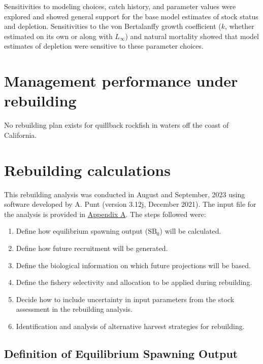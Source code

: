 \documentclass[11pt,
  letterpaper,
]{article}
\begin{document}
Sensitivities to modeling choices, catch history, and parameter values were explored and showed general support for the base model estimates of stock status and depletion. Sensitivities to the von Bertalanffy growth coefficient (\(k\), whether estimated on its own or along with \(L_\infty\)) and natural mortality showed that model estimates of depletion were sensitive to these parameter choices.

\hypertarget{management-performance-under-rebuilding}{%
\section{Management performance under rebuilding}\label{management-performance-under-rebuilding}}

No rebuilding plan exists for quillback rockfish in waters off the coast of California.

\hypertarget{rebuilding-calculations}{%
\section{Rebuilding calculations}\label{rebuilding-calculations}}

This rebuilding analysis was conducted in August and September, 2023 using software developed by A. Punt (version 3.12j, December 2021). The input file for the analysis is provided in \protect\hyperlink{append_a}{Appendix A}. The steps followed were:

\begin{enumerate}
    \item Define how equilibrium spawning output ($\text{SB}_0$) will be calculated. 
    \item Define how future recruitment will be generated.
    \item Define the biological information on which future projections will be based.
    \item Define the fishery selectivity and allocation to be applied during rebuilding. 
    \item Decide how to include uncertainty in input parameters from the stock assessment in the rebuilding analysis. 
    \item Identification and analysis of alternative harvest strategies for rebuilding. 
\end{enumerate}

\hypertarget{definition-of-equilibrium-spawning-output}{%
\subsection{Definition of Equilibrium Spawning Output}\label{definition-of-equilibrium-spawning-output}}
\end{document}

